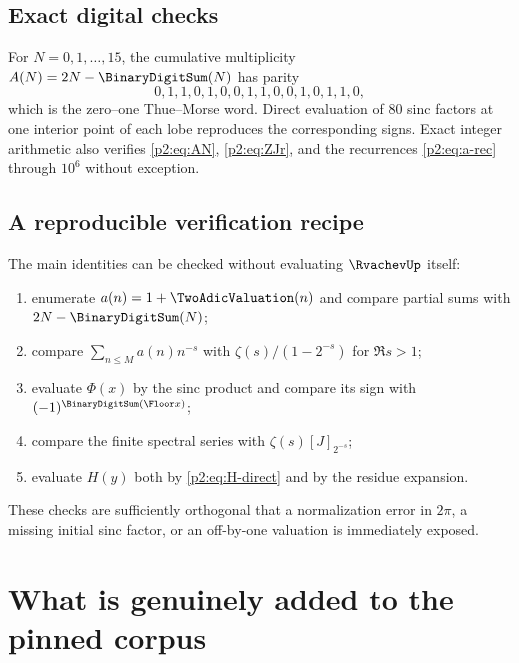 \documentclass[11pt]{article}
\numberwithin{equation}{section}
\theoremstyle{definition}
\theoremstyle{remark}
\begin{document}
\subsection{Exact digital checks}

For $N=0,1,\ldots,15$, the cumulative multiplicity
$A(N)=2N-\BinaryDigitSum(N)$ has parity
\[
 0,1,1,0,1,0,0,1,1,0,0,1,0,1,1,0,
\]
which is the zero--one Thue--Morse word.  Direct evaluation of 80 sinc factors at
one interior point of each lobe reproduces the corresponding signs.  Exact
integer arithmetic also verifies \eqref{p2:eq:AN}, \eqref{p2:eq:ZJr}, and the
recurrences \eqref{p2:eq:a-rec} through $10^6$ without exception.

\subsection{A reproducible verification recipe}

The main identities can be checked without evaluating $\RvachevUp$ itself:
\begin{enumerate}
\item enumerate $a(n)=1+\TwoAdicValuation(n)$ and compare partial sums with $2N-\BinaryDigitSum(N)$;
\item compare $\sum_{n\le M}a(n)n^{-s}$ with
      $\zeta(s)/(1-2^{-s})$ for $\Re s>1$;
\item evaluate $\Phi(x)$ by the sinc product and compare its sign with
      $(-1)^{\BinaryDigitSum(\Floor x)}$;
\item compare the finite spectral series with $\zeta(s)[J]_{2^{-s}}$;
\item evaluate $H(y)$ both by \eqref{p2:eq:H-direct} and by the residue expansion.
\end{enumerate}
These checks are sufficiently orthogonal that a normalization error in $2\pi$,
a missing initial sinc factor, or an off-by-one valuation is immediately exposed.

\section{What is genuinely added to the pinned corpus}
\label{p2:sec:novelty}
\end{document}

